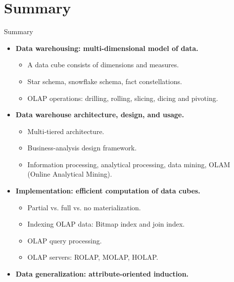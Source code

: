 \section{Summary}


\begin{frame}{Summary}
	\begin{itemize}
		\item \textbf{Data warehousing: multi-dimensional model of data.}
		      \begin{itemize}
			      \item A data cube consists of dimensions and measures.
			      \item Star schema, snowflake schema, fact constellations.
			      \item OLAP operations: drilling, rolling, slicing, dicing and pivoting.
		      \end{itemize}
		\item \textbf{Data warehouse architecture, design, and usage.}
		      \begin{itemize}
			      \item Multi-tiered architecture.
			      \item Business-analysis design framework.
			      \item Information processing, analytical processing, data mining, OLAM (Online Analytical Mining).
		      \end{itemize}
		\item \textbf{Implementation: efficient computation of data cubes.}
		      \begin{itemize}
			      \item Partial vs. full vs. no materialization.
			      \item Indexing OLAP data: Bitmap index and join index.
			      \item OLAP query processing.
			      \item OLAP servers: ROLAP, MOLAP, HOLAP.
		      \end{itemize}
		\item \textbf{Data generalization: attribute-oriented induction.}
	\end{itemize}
\end{frame}
